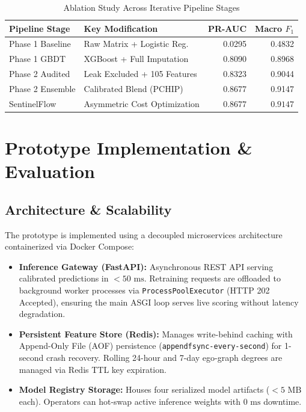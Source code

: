 \documentclass[conference]{IEEEtran}
\begin{document}
\begin{table}[h]
\centering
\caption{Ablation Study Across Iterative Pipeline Stages}
\label{tab:ablation}
\footnotesize
\begin{tabularx}{\columnwidth}{l X r r}
\toprule
\textbf{Pipeline Stage} & \textbf{Key Modification} & \textbf{PR-AUC} & \textbf{Macro $F_1$} \\ \midrule
Phase 1 Baseline & Raw Matrix + Logistic Reg. & 0.0295 & 0.4832 \\
Phase 1 GBDT & XGBoost + Full Imputation & 0.8090 & 0.8968 \\
Phase 2 Audited & Leak Excluded + 105 Features & 0.8323 & 0.9044 \\
Phase 2 Ensemble & Calibrated Blend (PCHIP) & 0.8677 & 0.9147 \\
SentinelFlow & Asymmetric Cost Optimization & $\mathbf{0.8677}$ & $\mathbf{0.9147}$ \\ \bottomrule
\end{tabularx}
\end{table}

\section{Prototype Implementation \& Evaluation}

\subsection{Architecture \& Scalability}
The prototype is implemented using a decoupled microservices architecture containerized via Docker Compose:
\begin{itemize}
    \item \textbf{Inference Gateway (FastAPI):} Asynchronous REST API serving calibrated predictions in $<50\text{ ms}$. Retraining requests are offloaded to background worker processes via \texttt{ProcessPoolExecutor} (HTTP 202 Accepted), ensuring the main ASGI loop serves live scoring without latency degradation.
    \item \textbf{Persistent Feature Store (Redis):} Manages write-behind caching with Append-Only File (AOF) persistence (\texttt{appendfsync-every-second}) for 1-second crash recovery. Rolling 24-hour and 7-day ego-graph degrees are managed via Redis TTL key expiration.
    \item \textbf{Model Registry Storage:} Houses four serialized model artifacts ($<5\text{ MB}$ each). Operators can hot-swap active inference weights with $0\text{ ms}$ downtime.
\end{itemize}
\end{document}
